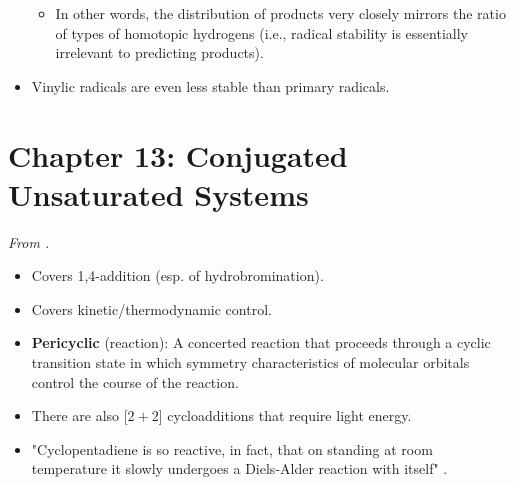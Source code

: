\documentclass[../notes.tex]{subfiles}
\begin{document}
\begin{itemize}
    \begin{itemize}
        \item In other words, the distribution of products very closely mirrors the ratio of types of homotopic hydrogens (i.e., radical stability is essentially irrelevant to predicting products).
    \end{itemize}
    \item Vinylic radicals are even less stable than primary radicals.
\end{itemize}



\section{Chapter 13: Conjugated Unsaturated Systems}
\emph{From \textcite{bib:SolomonsEtAl}.}
\begin{itemize}
    \item Covers 1,4-addition (esp. of hydrobromination).
    \item Covers kinetic/thermodynamic control.
    \item \textbf{Pericyclic} (reaction): A concerted reaction that proceeds through a cyclic transition state in which symmetry characteristics of molecular orbitals control the course of the reaction.
    \item There are also [$2+2$] cycloadditions that require light energy.
    \item "Cyclopentadiene is so reactive, in fact, that on standing at room temperature it slowly undergoes a Diels-Alder reaction with itself" \parencite[602]{bib:SolomonsEtAl}.
\end{itemize}
\end{document}
